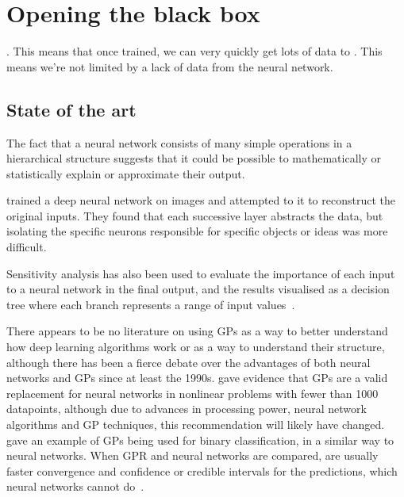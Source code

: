 
\chapter{Opening the black box}

.
This means that once trained, we can very quickly get lots of data to .
This means we're not limited by a lack of data from the neural network.

\section{State of the art}

The fact that  a neural network consists of many simple operations in a hierarchical structure suggests that it could be possible to mathematically or statistically explain or approximate their output.

\textcite{mahendran2014} trained a deep neural network on images and attempted to  it to reconstruct the original inputs.
They found that each successive layer abstracts the data, but isolating the specific neurons responsible for specific objects or ideas was more difficult.

Sensitivity analysis has also been used to evaluate the importance of each input to a neural network in the final output, and the results visualised as a decision tree where each branch represents a range of input values~\autocite[13]{cortez2013}.

There appears to be no literature on using \acp{GP} as a way to better understand how deep learning algorithms work or as a way to understand their structure, although there has been a fierce debate over the advantages of both neural networks and \acp{GP} since at least the 1990s.
\textcite[65--66]{rasmussen1997} gave evidence that \acp{GP} are a valid replacement for neural networks in nonlinear problems with fewer than 1000 datapoints, although due to advances in processing power, neural network algorithms and \ac{GP} techniques, this recommendation will likely have changed.
\textcite[25]{mackay1997} gave an example of \acp{GP} being used for binary classification, in a similar way to neural networks.
When \ac{GPR} and neural networks are compared,  are usually faster convergence and confidence or credible intervals for the predictions, which neural networks cannot do~\autocite{herbrich2003}.


